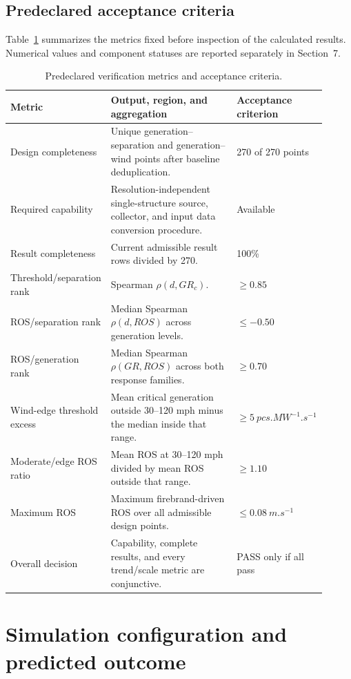\subsection{Predeclared acceptance criteria}

Table~\ref{tab:acceptance-contract} summarizes the metrics fixed before
inspection of the calculated results. Numerical values and component statuses
are reported separately in Section~7.

\begin{table}[H]
\centering
\footnotesize
\caption{Predeclared verification metrics and acceptance criteria.}
\label{tab:acceptance-contract}
\begin{tabular}{@{}p{0.23\linewidth}p{0.47\linewidth}p{0.21\linewidth}@{}}
\toprule
Metric & Output, region, and aggregation & Acceptance criterion\\
\midrule
Design completeness & Unique generation--separation and generation--wind points after baseline deduplication. & 270 of 270 points \\
Required capability & Resolution-independent single-structure source, collector, and input data conversion procedure. & Available \\
Result completeness & Current admissible result rows divided by 270. & 100\% \\
Threshold/separation rank & Spearman \(\rho(d,GR_{c})\). & \(\ge0.85\) \\
ROS/separation rank & Median Spearman \(\rho(d,ROS)\) across generation levels. & \(\le-0.50\) \\
ROS/generation rank & Median Spearman \(\rho(GR,ROS)\) across both response families. & \(\ge0.70\) \\
Wind-edge threshold excess & Mean critical generation outside 30--120 mph minus the median inside that range. & \(\ge\SI{5}{pcs.MW^{-1}.s^{-1}}\) \\
Moderate/edge ROS ratio & Mean ROS at 30--120 mph divided by mean ROS outside that range. & \(\ge1.10\) \\
Maximum ROS & Maximum firebrand-driven ROS over all admissible design points. & \(\le\SI{0.08}{m.s^{-1}}\) \\
Overall decision & Capability, complete results, and every trend/scale metric are conjunctive. & PASS only if all pass \\
\bottomrule
\end{tabular}
\end{table}

\section{Simulation configuration and predicted outcome}


